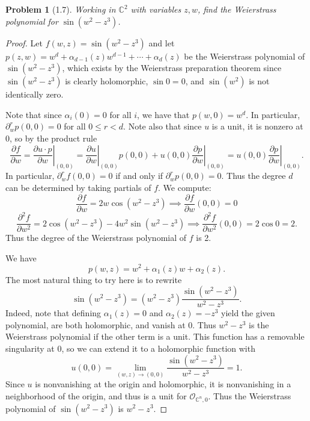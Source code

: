 \documentclass[11pt, letterpaper]{article}
\theoremstyle{plain}
\newtheorem{problem}{Problem}
\begin{document}
\begin{problem}[1.7]
	Working in $\mathbb{C} ^2$ with variables $z,w$, find the Weierstrass polynomial for $\sin (w^2-z^3)$.
\end{problem}
\begin{proof}
	Let $f(w,z)=\sin (w^2-z^3)$ and let $p(z,w)=w^d + \alpha _{d-1} (z)w^{d-1} +\cdots +\alpha _d(z)$ be the Weierstrass polynomial of $\sin (w^2-z^3)$, which exists by the Weierstrass preparation theorem since $\sin (w^2-z^3)$ is clearly holomorphic, $\sin 0=0$, and $\sin (w^2)$ is not identically zero.

	Note that since $\alpha _i(0)=0$ for all $i$, we have that $p(w,0)=w^d$. In particular, $\partial^r_w p(0,0)=0$ for all $0\leq r < d$. Note also that since $u$ is a unit, it is nonzero at 0, so by the product rule
	\[
		\frac{\partial f}{\partial w} =\left.\frac{\partial u\cdot p}{\partial w}\right|_{(0,0)} =\left.\frac{\partial u}{\partial w}\right|_{(0,0)}  p(0,0)+u(0,0) \left.\frac{\partial p}{\partial w} \right|_{(0,0)}=u(0,0) \left. \frac{\partial p}{\partial w} \right|_{(0,0)} 
	.\]
	In particular, $\partial_w^rf(0,0)=0$ if and only if $\partial _w^rp(0,0)=0$. Thus the degree $d$ can be determined by taking partials of $f$. We compute:
	\[
		\frac{\partial f}{\partial w} =2w \cos \left( w^2-z^3 \right) \implies \frac{\partial f}{\partial w} (0,0)=0
	\]
	\[
		\frac{\partial ^2f}{\partial w^2} =2\cos \left( w^2-z^3 \right) - 4w^2 \sin \left( w^2-z^3 \right) \implies \frac{\partial ^2f}{\partial w^2} (0,0)=2\cos 0=2
	.\]
	Thus the degree of the Weierstrass polynomial of $f$ is 2.

	We have
	\[
		p(w,z)=w^2+\alpha _1(z)w+\alpha _2(z)
	.\]
	The most natural thing to try here is to rewrite
	\[
		\sin \left( w^2-z^3 \right) =\left( w^2-z^3 \right) \frac{\sin \left( w^2-z^3 \right) }{w^2-z^3} 
	.\]
	Indeed, note that defining $\alpha _1(z)=0$ and $\alpha _2(z)=-z^3$ yield the given polynomial, are both holomorphic, and vanish at 0. Thus $w^2-z^3$ is the Weierstrass polynomial if the other term is a unit. This function has a removable singularity at 0, so we can extend it to a holomorphic function with
	\[
		u(0,0)=\lim_{(w,z)\to (0,0)} \frac{\sin (w^2-z^3)}{w^2-z^3} =1
	.\]
	Since $u$ is nonvanishing at the origin and holomorphic, it is nonvanishing in a neighborhood of the origin, and thus is a unit for $\mathcal{O} _{\mathbb{C} ^n,0} $. Thus the Weierstrass polynomial of $\sin \left( w^2-z^3 \right) $ is $w^2-z^3$.
\end{proof}
\end{document}
